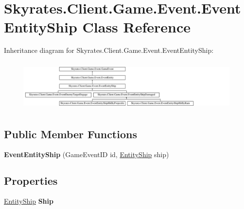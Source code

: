 \hypertarget{class_skyrates_1_1_client_1_1_game_1_1_event_1_1_event_entity_ship}{\section{Skyrates.\-Client.\-Game.\-Event.\-Event\-Entity\-Ship Class Reference}
\label{class_skyrates_1_1_client_1_1_game_1_1_event_1_1_event_entity_ship}
}
Inheritance diagram for Skyrates.\-Client.\-Game.\-Event.\-Event\-Entity\-Ship\-:\begin{figure}[H]
\begin{center}
\leavevmode
\includegraphics[height=2.651515cm]{class_skyrates_1_1_client_1_1_game_1_1_event_1_1_event_entity_ship}
\end{center}
\end{figure}
\subsection*{Public Member Functions}
\begin{DoxyCompactItemize}
\item 
\hypertarget{class_skyrates_1_1_client_1_1_game_1_1_event_1_1_event_entity_ship_a21ae1f26af04bed9f7fff19e1d997ec3}{{\bfseries Event\-Entity\-Ship} (Game\-Event\-I\-D id, \hyperlink{class_skyrates_1_1_common_1_1_entity_1_1_entity_ship}{Entity\-Ship} ship)}\label{class_skyrates_1_1_client_1_1_game_1_1_event_1_1_event_entity_ship_a21ae1f26af04bed9f7fff19e1d997ec3}

\end{DoxyCompactItemize}
\subsection*{Properties}
\begin{DoxyCompactItemize}
\item 
\hypertarget{class_skyrates_1_1_client_1_1_game_1_1_event_1_1_event_entity_ship_aaac97a0d035d3163af76aa5f67bc9c5c}{\hyperlink{class_skyrates_1_1_common_1_1_entity_1_1_entity_ship}{Entity\-Ship} {\bfseries Ship}}\label{class_skyrates_1_1_client_1_1_game_1_1_event_1_1_event_entity_ship_aaac97a0d035d3163af76aa5f67bc9c5c}

\end{DoxyCompactItemize}

